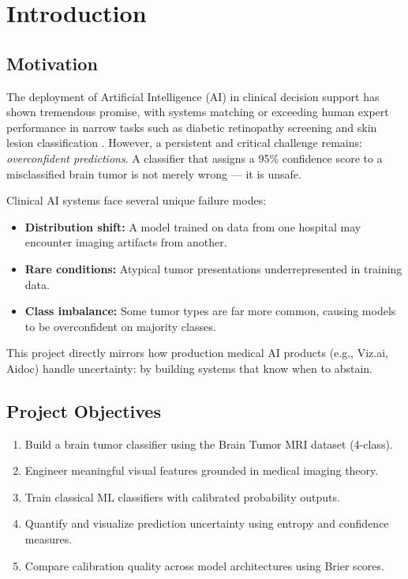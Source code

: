 \documentclass[12pt,a4paper]{article}
\begin{document}
\section{Introduction}

\subsection{Motivation}

The deployment of Artificial Intelligence (AI) in clinical decision support has shown tremendous promise, with systems matching or exceeding human expert performance in narrow tasks such as diabetic retinopathy screening \citep{gulshan2016development} and skin lesion classification \citep{esteva2017dermatologist}. However, a persistent and critical challenge remains: \textit{overconfident predictions}. A classifier that assigns a 95\% confidence score to a misclassified brain tumor is not merely wrong — it is unsafe.

Clinical AI systems face several unique failure modes:
\begin{itemize}[noitemsep]
    \item \textbf{Distribution shift:} A model trained on data from one hospital may encounter imaging artifacts from another.
    \item \textbf{Rare conditions:} Atypical tumor presentations underrepresented in training data.
    \item \textbf{Class imbalance:} Some tumor types are far more common, causing models to be overconfident on majority classes.
\end{itemize}

This project directly mirrors how production medical AI products (e.g., Viz.ai, Aidoc) handle uncertainty: by building systems that know when to abstain.

\subsection{Project Objectives}

\begin{enumerate}[noitemsep]
    \item Build a brain tumor classifier using the Brain Tumor MRI dataset (4-class).
    \item Engineer meaningful visual features grounded in medical imaging theory.
    \item Train classical ML classifiers with calibrated probability outputs.
    \item Quantify and visualize prediction uncertainty using entropy and confidence measures.
    \item Compare calibration quality across model architectures using Brier scores.
\end{enumerate}
\end{document}
